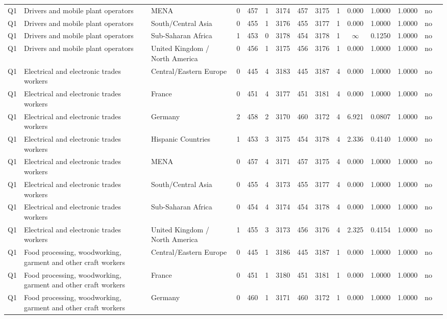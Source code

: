 \begin{longtable}{lllrcccccccccll}
Q1 & Drivers and mobile plant operators & MENA & 0 & 457 & 1 & 3174 & 457 & 3175 & 1 & 0.000 & 1.0000 & 1.0000 & no \\
Q1 & Drivers and mobile plant operators & South/Central Asia & 0 & 455 & 1 & 3176 & 455 & 3177 & 1 & 0.000 & 1.0000 & 1.0000 & no \\
Q1 & Drivers and mobile plant operators & Sub-Saharan Africa & 1 & 453 & 0 & 3178 & 454 & 3178 & 1 & $\infty$ & 0.1250 & 1.0000 & no \\
Q1 & Drivers and mobile plant operators & United Kingdom / North America & 0 & 456 & 1 & 3175 & 456 & 3176 & 1 & 0.000 & 1.0000 & 1.0000 & no \\
Q1 & Electrical and electronic trades workers & Central/Eastern Europe & 0 & 445 & 4 & 3183 & 445 & 3187 & 4 & 0.000 & 1.0000 & 1.0000 & no \\
Q1 & Electrical and electronic trades workers & France & 0 & 451 & 4 & 3177 & 451 & 3181 & 4 & 0.000 & 1.0000 & 1.0000 & no \\
Q1 & Electrical and electronic trades workers & Germany & 2 & 458 & 2 & 3170 & 460 & 3172 & 4 & 6.921 & 0.0807 & 1.0000 & no \\
Q1 & Electrical and electronic trades workers & Hispanic Countries & 1 & 453 & 3 & 3175 & 454 & 3178 & 4 & 2.336 & 0.4140 & 1.0000 & no \\
Q1 & Electrical and electronic trades workers & MENA & 0 & 457 & 4 & 3171 & 457 & 3175 & 4 & 0.000 & 1.0000 & 1.0000 & no \\
Q1 & Electrical and electronic trades workers & South/Central Asia & 0 & 455 & 4 & 3173 & 455 & 3177 & 4 & 0.000 & 1.0000 & 1.0000 & no \\
Q1 & Electrical and electronic trades workers & Sub-Saharan Africa & 0 & 454 & 4 & 3174 & 454 & 3178 & 4 & 0.000 & 1.0000 & 1.0000 & no \\
Q1 & Electrical and electronic trades workers & United Kingdom / North America & 1 & 455 & 3 & 3173 & 456 & 3176 & 4 & 2.325 & 0.4154 & 1.0000 & no \\
Q1 & Food processing, woodworking, garment and other craft workers & Central/Eastern Europe & 0 & 445 & 1 & 3186 & 445 & 3187 & 1 & 0.000 & 1.0000 & 1.0000 & no \\
Q1 & Food processing, woodworking, garment and other craft workers & France & 0 & 451 & 1 & 3180 & 451 & 3181 & 1 & 0.000 & 1.0000 & 1.0000 & no \\
Q1 & Food processing, woodworking, garment and other craft workers & Germany & 0 & 460 & 1 & 3171 & 460 & 3172 & 1 & 0.000 & 1.0000 & 1.0000 & no \\

\end{longtable}
